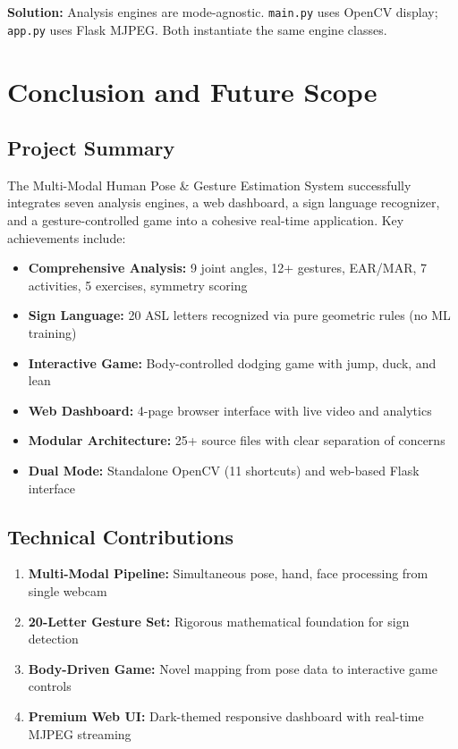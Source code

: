\documentclass[a4paper,12pt]{report}
\begin{document}
\textbf{Solution:} Analysis engines are mode-agnostic. \texttt{main.py} uses OpenCV display; \texttt{app.py} uses Flask MJPEG. Both instantiate the same engine classes.

\newpage

\chapter{Conclusion and Future Scope}
\thispagestyle{contentpages}
\justifying

\section{Project Summary}
The Multi-Modal Human Pose \& Gesture Estimation System successfully integrates seven analysis engines, a web dashboard, a sign language recognizer, and a gesture-controlled game into a cohesive real-time application. Key achievements include:

\begin{itemize}
    \item \textbf{Comprehensive Analysis:} 9 joint angles, 12+ gestures, EAR/MAR, 7 activities, 5 exercises, symmetry scoring
    \item \textbf{Sign Language:} 20 ASL letters recognized via pure geometric rules (no ML training)
    \item \textbf{Interactive Game:} Body-controlled dodging game with jump, duck, and lean
    \item \textbf{Web Dashboard:} 4-page browser interface with live video and analytics
    \item \textbf{Modular Architecture:} 25+ source files with clear separation of concerns
    \item \textbf{Dual Mode:} Standalone OpenCV (11 shortcuts) and web-based Flask interface
\end{itemize}

\section{Technical Contributions}
\begin{enumerate}
    \item \textbf{Multi-Modal Pipeline:} Simultaneous pose, hand, face processing from single webcam
    \item \textbf{20-Letter Gesture Set:} Rigorous mathematical foundation for sign detection
    \item \textbf{Body-Driven Game:} Novel mapping from pose data to interactive game controls
    \item \textbf{Premium Web UI:} Dark-themed responsive dashboard with real-time MJPEG streaming
\end{enumerate}
\end{document}
